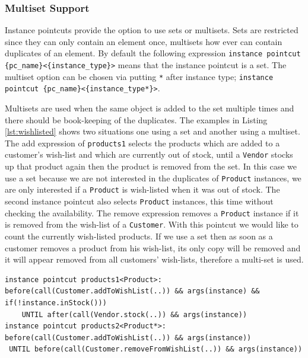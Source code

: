 \documentclass{llncs}
\begin{document}
\subsubsection{Multiset Support}
Instance pointcuts provide the option to use sets or multisets. Sets are restricted since they can only contain an element once, multisets how ever can contain duplicates of an element. By default the following expression \lstinline!instance pointcut {pc_name}<{instance_type}>! means that the instance pointcut is a set. The multiset option can be chosen via putting \texttt{*} after instance type; \lstinline!instance pointcut {pc_name}<{instance_type*}>!.

Multisets are used when the same object is added to the set multiple times and there should be book-keeping of the duplicates. The examples in Listing \ref{lst:wishlisted} shows two situations one using a set and another using a multiset. The add expression of \texttt{products1} selects the products which are added to a customer's wish-list and which are currently out of stock, until a \texttt{Vendor} stocks up that product again then the product is removed from the set. In this case we use a set because we are not interested in the duplicates of \texttt{Product} instances, we are only interested if a \texttt{Product} is wish-listed when it was out of stock. The second instance pointcut also selects \texttt{Product} instances, this time without checking the availability. The remove expression removes a \texttt{Product} instance if it is removed from the wish-list of a \texttt{Customer}. With this pointcut we would like to count the currently wish-listed products. If we use a set then as soon as a customer removes a product from his wish-list, its only copy will be removed and it will appear removed from all customers' wish-lists, therefore a multi-set is used. 

\begin{lstlisting}[float=h!, caption={Two instance pointcuts, each maintains a set of wish-listed products}, label={lst:wishlisted}]
instance pointcut products1<Product>: 
before(call(Customer.addToWishList(..)) && args(instance) && if(!instance.inStock())) 
	UNTIL after(call(Vendor.stock(..)) && args(instance))
instance pointcut products2<Product*>: 
before(call(Customer.addToWishList(..)) && args(instance))
 UNTIL before(call(Customer.removeFromWishList(..)) && args(instance))
\end{lstlisting}
\end{document}
